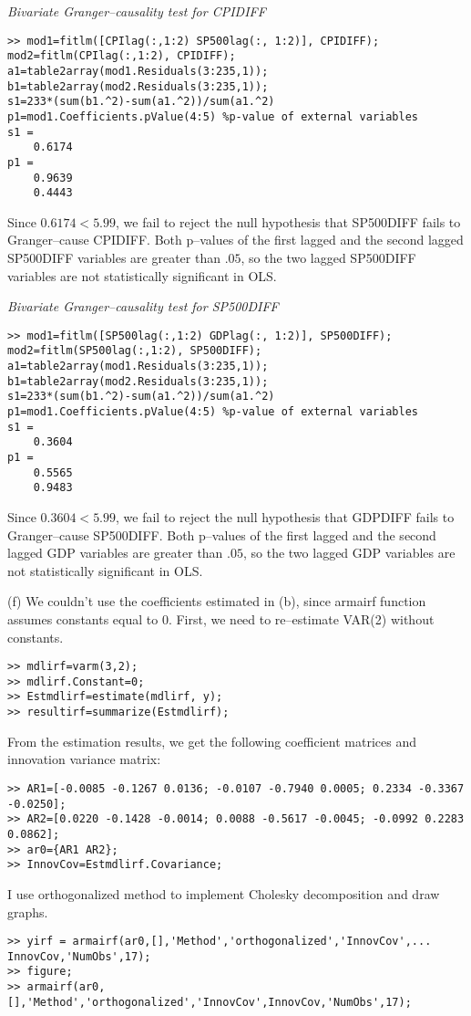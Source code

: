 \documentclass[11pt]{article}
\begin{document}
\bigskip
\noindent \textit{Bivariate Granger--causality test for CPIDIFF}
\begin{lstlisting}
>> mod1=fitlm([CPIlag(:,1:2) SP500lag(:, 1:2)], CPIDIFF);
mod2=fitlm(CPIlag(:,1:2), CPIDIFF);
a1=table2array(mod1.Residuals(3:235,1));
b1=table2array(mod2.Residuals(3:235,1));
s1=233*(sum(b1.^2)-sum(a1.^2))/sum(a1.^2)
p1=mod1.Coefficients.pValue(4:5) %p-value of external variables
s1 =
    0.6174
p1 =
    0.9639
    0.4443
\end{lstlisting}
Since $0.6174<5.99$, we fail to reject the null hypothesis that SP500DIFF fails to Granger--cause CPIDIFF. Both p--values of the first lagged and the second lagged SP500DIFF variables are greater than $.05$, so the two lagged SP500DIFF variables are not statistically significant in OLS.

\bigskip
\noindent \textit{Bivariate Granger--causality test for SP500DIFF}
\begin{lstlisting}
>> mod1=fitlm([SP500lag(:,1:2) GDPlag(:, 1:2)], SP500DIFF);
mod2=fitlm(SP500lag(:,1:2), SP500DIFF);
a1=table2array(mod1.Residuals(3:235,1));
b1=table2array(mod2.Residuals(3:235,1));
s1=233*(sum(b1.^2)-sum(a1.^2))/sum(a1.^2)
p1=mod1.Coefficients.pValue(4:5) %p-value of external variables
s1 =
    0.3604
p1 =
    0.5565
    0.9483
\end{lstlisting}
Since $0.3604<5.99$, we fail to reject the null hypothesis that GDPDIFF fails to Granger--cause SP500DIFF. Both p--values of the first lagged and the second lagged GDP variables are greater than $.05$, so the two lagged GDP variables are not statistically significant in OLS.

\bigskip
(f) We couldn't use the coefficients estimated in (b), since armairf function assumes constants equal to $0$. First, we need to re--estimate VAR(2) without constants.
\begin{lstlisting}
>> mdlirf=varm(3,2);
>> mdlirf.Constant=0;
>> Estmdlirf=estimate(mdlirf, y);
>> resultirf=summarize(Estmdlirf);
\end{lstlisting}

From the estimation results, we get the following coefficient matrices and innovation variance matrix:
\begin{lstlisting}
>> AR1=[-0.0085 -0.1267 0.0136; -0.0107 -0.7940 0.0005; 0.2334 -0.3367 -0.0250];
>> AR2=[0.0220 -0.1428 -0.0014; 0.0088 -0.5617 -0.0045; -0.0992 0.2283 0.0862];
>> ar0={AR1 AR2};
>> InnovCov=Estmdlirf.Covariance;
\end{lstlisting}
I use orthogonalized method to implement Cholesky decomposition and draw graphs.
\begin{lstlisting}
>> yirf = armairf(ar0,[],'Method','orthogonalized','InnovCov',...
InnovCov,'NumObs',17);
>> figure;
>> armairf(ar0,[],'Method','orthogonalized','InnovCov',InnovCov,'NumObs',17);
\end{lstlisting}
\end{document}
